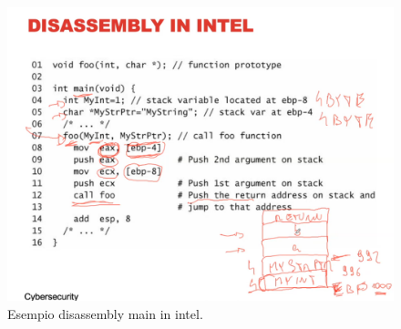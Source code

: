 \begin{figure}[H]
    \centering
    \includegraphics[width=13cm, keepaspectratio]{capitoli/secure_coding/img/cap_2/disass_intel_1.png}
    \caption{Esempio disassembly main in intel.}\label{fig:disass_intel_1}
\end{figure}

